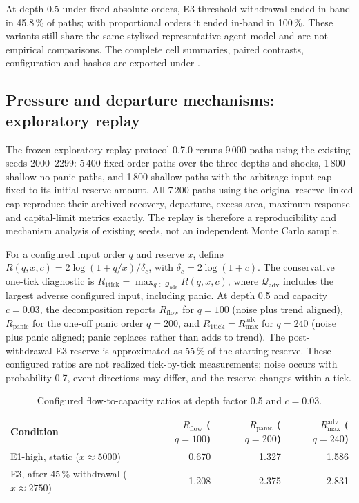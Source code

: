 At depth 0.5 under fixed absolute orders, E3 threshold-withdrawal ended in-band in 45.8\,\% of paths; with proportional orders it ended in-band in 100\,\%. These variants still share the same stylized representative-agent model and are not empirical comparisons. The complete cell summaries, paired contrasts, configuration and hashes are exported under .

\subsection{Pressure and departure mechanisms: exploratory replay}

The frozen exploratory replay protocol 0.7.0 reruns 9\,000 paths using the existing seeds 2000--2299: 5\,400 fixed-order paths over the three depths and shocks, 1\,800 shallow no-panic paths, and 1\,800 shallow paths with the arbitrage input cap fixed to its initial-reserve amount. All 7\,200 paths using the original reserve-linked cap reproduce their archived recovery, departure, excess-area, maximum-response and capital-limit metrics exactly. The replay is therefore a reproducibility and mechanism analysis of existing seeds, not an independent Monte Carlo sample.

For a configured input order $q$ and reserve $x$, define $R(q,x,c)=2\log(1+q/x)/\delta_c$, with $\delta_c=2\log(1+c)$. The conservative one-tick diagnostic is $R_{\mathrm{1tick}}=\max_{q\in\mathcal Q_{\mathrm{adv}}}R(q,x,c)$, where $\mathcal Q_{\mathrm{adv}}$ includes the largest adverse configured input, including panic. At depth 0.5 and capacity $c=0.03$, the decomposition reports $R_{\mathrm{flow}}$ for $q=100$ (noise plus trend aligned), $R_{\mathrm{panic}}$ for the one-off panic order $q=200$, and $R_{\mathrm{1tick}}=R_{\max}^{\mathrm{adv}}$ for $q=240$ (noise plus panic aligned; panic replaces rather than adds to trend). The post-withdrawal E3 reserve is approximated as 55\,\% of the starting reserve. These configured ratios are not realized tick-by-tick measurements; noise occurs with probability 0.7, event directions may differ, and the reserve changes within a tick.

\begin{table}[htbp]
\centering
\caption{Configured flow-to-capacity ratios at depth factor 0.5 and $c=0.03$.}
\label{tab:pressure-ratio}
\small
\begin{tabular}{@{}lrrr@{}}
\toprule
Condition & $R_{\mathrm{flow}}$ ($q=100$) & $R_{\mathrm{panic}}$ ($q=200$) & $R_{\max}^{\mathrm{adv}}$ ($q=240$) \\
\midrule
E1-high, static ($x\approx5000$) & 0.670 & 1.327 & 1.586 \\
E3, after 45\,\% withdrawal ($x\approx2750$) & 1.208 & 2.375 & 2.831 \\
\bottomrule
\end{tabular}
\end{table}

